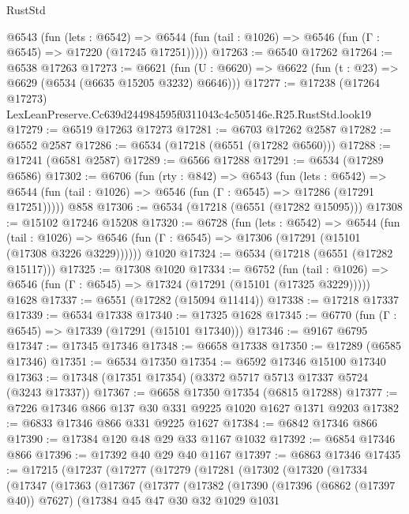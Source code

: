\begin{lexlean}{RustStd}
\begin{coremodule}
    @6543
      (fun (lets : @6542) =>
      @6544 (fun (tail : @1026) => @6546 (fun (Γ : @6545) => @17220 (@17245 @17251)))))
@17263 := @6540 @17262
@17264 := @6538 @17263
@17273 := @6621
    (fun (U : @6620) => @6622 (fun (t : @23) => @6629 (@6534 (@6635 @15205 @3232) @6646)))
@17277 := @17238
    (@17264 @17273)
    LexLeanPreserve.Cc639d244984595f0311043c4c505146e.R25.RustStd.look19
@17279 := @6519 @17263 @17273
@17281 := @6703 @17262 @2587
@17282 := @6552 @2587
@17286 := @6534 (@17218 (@6551 (@17282 @6560)))
@17288 := @17241 (@6581 @2587)
@17289 := @6566 @17288
@17291 := @6534 (@17289 @6586)
@17302 := @6706
    (fun (rty : @842) =>
    @6543
      (fun (lets : @6542) =>
      @6544 (fun (tail : @1026) => @6546 (fun (Γ : @6545) => @17286 (@17291 @17251)))))
    @858
@17306 := @6534 (@17218 (@6551 (@17282 @15095)))
@17308 := @15102 @17246 @15208
@17320 := @6728
    (fun (lets : @6542) =>
    @6544
      (fun (tail : @1026) =>
      @6546 (fun (Γ : @6545) => @17306 (@17291 (@15101 (@17308 @3226 @3229))))))
    @1020
@17324 := @6534 (@17218 (@6551 (@17282 @15117)))
@17325 := @17308 @1020
@17334 := @6752
    (fun (tail : @1026) => @6546 (fun (Γ : @6545) => @17324 (@17291 (@15101 (@17325 @3229)))))
    @1628
@17337 := @6551 (@17282 (@15094 @11414))
@17338 := @17218 @17337
@17339 := @6534 @17338
@17340 := @17325 @1628
@17345 := @6770 (fun (Γ : @6545) => @17339 (@17291 (@15101 @17340)))
@17346 := @9167 @6795
@17347 := @17345 @17346
@17348 := @6658 @17338
@17350 := @17289 (@6585 @17346)
@17351 := @6534 @17350
@17354 := @6592 @17346 @15100 @17340
@17363 := @17348 (@17351 @17354) (@3372 @5717 @5713 @17337 @5724 (@3243 @17337))
@17367 := @6658 @17350 @17354 (@6815 @17288)
@17377 := @7226 @17346 @866 @137 @30 @331 @9225 @1020 @1627 @1371 @9203
@17382 := @6833 @17346 @866 @331 @9225 @1627
@17384 := @6842 @17346 @866
@17390 := @17384 @120 @48 @29 @33 @1167 @1032
@17392 := @6854 @17346 @866
@17396 := @17392 @40 @29 @40 @1167
@17397 := @6863 @17346
@17435 := @17215
    (@17237
      (@17277
        (@17279
          (@17281
            (@17302
              (@17320
                (@17334
                  (@17347
                    (@17363
                      (@17367
                        (@17377
                          (@17382
                            (@17390
                              (@17396 (@6862 (@17397 @40)) @7627)
                              (@17384
                                @45
                                @47
                                @30
                                @32
                                @1029
                                @1031

\end{coremodule}
\end{lexlean}
